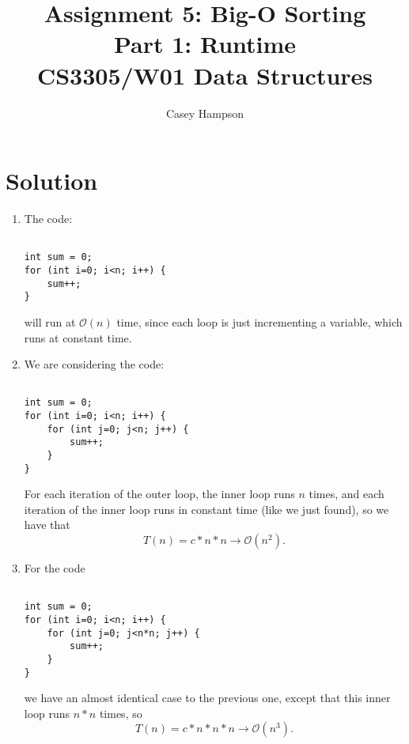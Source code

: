 \documentclass{article}
\title{Assignment 5: Big-O Sorting \\[5pt] Part 1: Runtime \\[8pt] CS3305/W01 Data Structures}
\author{Casey Hampson}
\begin{document}
\maketitle


\section*{Solution}
\begin{enumerate}
\item The code:

\begin{verbatim}

int sum = 0;
for (int i=0; i<n; i++) {
    sum++;
}

\end{verbatim}
    
will run at $\mathcal{O}(n)$ time, since each loop is just incrementing a variable, which runs at constant time.




\item We are considering the code:

\begin{verbatim}

int sum = 0;
for (int i=0; i<n; i++) {
    for (int j=0; j<n; j++) {
        sum++;
    }
}

\end{verbatim}

For each iteration of the outer loop, the inner loop runs $n$ times, and each iteration of the inner loop runs in constant time (like we just found), so we have that
\begin{equation*}
    T(n) = c * n * n \rightarrow \mathcal{O}(n^2).
\end{equation*}






\item For the code

\begin{verbatim}

int sum = 0;
for (int i=0; i<n; i++) {
    for (int j=0; j<n*n; j++) {
        sum++;
    }
}

\end{verbatim}

we have an almost identical case to the previous one, except that this inner loop runs $n*n$ times, so
\begin{equation*}
    T(n) = c*n*n*n \rightarrow \mathcal{O}(n^3).
\end{equation*}





\end{enumerate}
\end{document}
